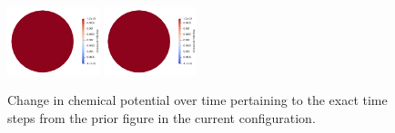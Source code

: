 \documentclass[12pt,3p]{article}
\numberwithin{equation}{section}
\begin{document}
\begin{figure}[!htb]
\includegraphics[width=0.24\textwidth]{./Results/Sphere/S_140_chi_3.0e-01_G_1e+00_l0_2.0e+00/Images/ChemicalPotential/ChemPot_109}
\includegraphics[width=0.24\textwidth]{./Results/Sphere/S_140_chi_3.0e-01_G_1e+00_l0_2.0e+00/Images/ChemicalPotential/ChemPot_139}
\caption{Change in chemical potential over time pertaining to the exact time steps from the prior figure in the current configuration.}
\label{FigSphereChemEvo}
\end{figure}
\end{document}
